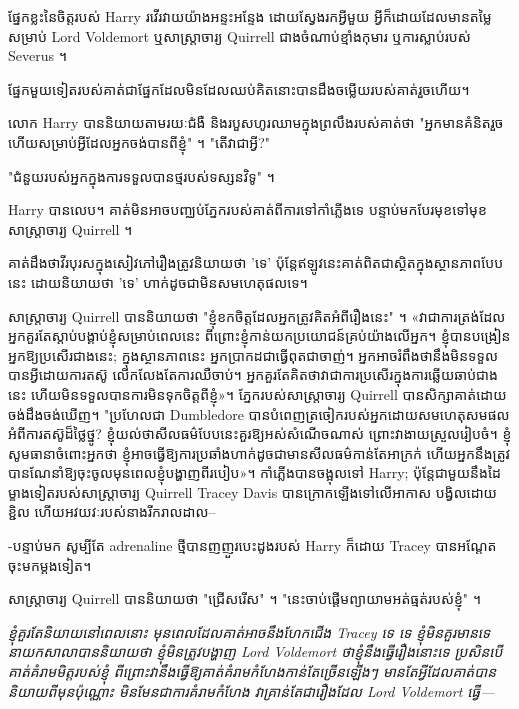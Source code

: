 ផ្នែកខ្លះនៃចិត្តរបស់ Harry រវើរវាយយ៉ាងអន្ទះអន្ទែង ដោយស្វែងរកអ្វីមួយ អ្វីក៏ដោយដែលមានតម្លៃសម្រាប់ Lord Voldemort ឬសាស្រ្តាចារ្យ Quirrell ជាងចំណាប់ខ្មាំងកុមារ ឬការស្លាប់របស់ Severus ។

ផ្នែក​មួយ​ទៀត​របស់​គាត់​ជា​ផ្នែក​ដែល​មិន​ដែល​ឈប់​គិត​នោះ​បាន​ដឹង​ចម្លើយ​របស់​គាត់​រួច​ហើយ។

លោក Harry បាននិយាយតាមរយៈជំងឺ និងរបួសហូរឈាមក្នុងព្រលឹងរបស់គាត់ថា "អ្នកមានគំនិតរួចហើយសម្រាប់អ្វីដែលអ្នកចង់បានពីខ្ញុំ" ។ "តើវាជាអ្វី?"

"ជំនួយរបស់អ្នកក្នុងការទទួលបានថ្មរបស់ទស្សនវិទូ" ។

Harry បានលេប។ គាត់មិនអាចបញ្ឈប់ភ្នែករបស់គាត់ពីការទៅកាំភ្លើងទេ បន្ទាប់មកបែរមុខទៅមុខសាស្រ្តាចារ្យ Quirrell ។

គាត់ដឹងថាវីរបុរសក្នុងសៀវភៅរឿងត្រូវនិយាយថា 'ទេ' ប៉ុន្តែឥឡូវនេះគាត់ពិតជាស្ថិតក្នុងស្ថានភាពបែបនេះ ដោយនិយាយថា 'ទេ' ហាក់ដូចជាមិនសមហេតុផលទេ។

សាស្រ្តាចារ្យ Quirrell បាននិយាយថា "ខ្ញុំខកចិត្តដែលអ្នកត្រូវគិតអំពីរឿងនេះ" ។ «វា​ជា​ការ​ត្រង់​ដែល​អ្នក​គួរ​តែ​ស្តាប់​បង្គាប់​ខ្ញុំ​សម្រាប់​ពេល​នេះ ពី​ព្រោះ​ខ្ញុំ​កាន់​យក​ប្រយោជន៍​គ្រប់​យ៉ាង​លើ​អ្នក។ ខ្ញុំបានបង្រៀនអ្នកឱ្យប្រសើរជាងនេះ; ក្នុងស្ថានភាពនេះ អ្នកប្រាកដជាធ្វើពុតជាចាញ់។ អ្នកអាចរំពឹងថានឹងមិនទទួលបានអ្វីដោយការតស៊ូ លើកលែងតែការឈឺចាប់។ អ្នក​គួរ​តែ​គិត​ថា​វា​ជា​ការ​ប្រសើរ​ក្នុង​ការ​ឆ្លើយ​ឆាប់​ជាង​នេះ ហើយ​មិន​ទទួល​បាន​ការ​មិន​ទុក​ចិត្ត​ពី​ខ្ញុំ»។ ភ្នែករបស់សាស្រ្តាចារ្យ Quirrell បានសិក្សាគាត់ដោយចង់ដឹងចង់ឃើញ។ "ប្រហែលជា Dumbledore បានបំពេញត្រចៀករបស់អ្នកដោយសមហេតុសមផលអំពីការតស៊ូដ៏ថ្លៃថ្នូ? ខ្ញុំយល់ថាសីលធម៌បែបនេះគួរឱ្យអស់សំណើចណាស់ ព្រោះវាងាយស្រួលរៀបចំ។ ខ្ញុំ​សូម​ធានា​ចំពោះ​អ្នក​ថា ខ្ញុំ​អាច​ធ្វើ​ឱ្យ​ការ​ប្រឆាំង​ហាក់​ដូច​ជា​មាន​សីលធម៌​កាន់​តែ​អាក្រក់ ហើយ​អ្នក​នឹង​ត្រូវ​បាន​ណែនាំ​ឱ្យ​ចុះ​ចូល​មុន​ពេល​ខ្ញុំ​បង្ហាញ​ពី​របៀប​»។ កាំភ្លើងបានចង្អុលទៅ Harry; ប៉ុន្តែជាមួយនឹងដៃម្ខាងទៀតរបស់សាស្រ្តាចារ្យ Quirrell Tracey Davis បានក្រោកឡើងទៅលើអាកាស បង្វិលដោយខ្ជិល ហើយអវយវៈរបស់នាងរីករាលដាល--

-បន្ទាប់មក សូម្បីតែ adrenaline ថ្មីបានញញួរបេះដូងរបស់ Harry ក៏ដោយ Tracey បានអណ្តែតចុះមកម្តងទៀត។

សាស្រ្តាចារ្យ Quirrell បាននិយាយថា "ជ្រើសរើស" ។ "នេះចាប់ផ្តើមព្យាយាមអត់ធ្មត់របស់ខ្ញុំ" ។

\emph{ខ្ញុំគួរតែនិយាយនៅពេលនោះ មុនពេលដែលគាត់អាចនឹងហែកជើង Tracey ទេ ទេ ខ្ញុំមិនគួរមានទេ នាយកសាលាបាននិយាយថា ខ្ញុំមិនត្រូវបង្ហាញ Lord Voldemort ថាខ្ញុំនឹងធ្វើរឿងនោះទេ ប្រសិនបើគាត់គំរាមមិត្តរបស់ខ្ញុំ ពីព្រោះវានឹងធ្វើឱ្យគាត់គំរាមកំហែងកាន់តែច្រើនឡើងៗ មានតែអ្វីដែលគាត់បាននិយាយពីមុនប៉ុណ្ណោះ មិនមែនជាការគំរាមកំហែង\emph{} វាគ្រាន់តែជារឿងដែល Lord Voldemort \emph{ធ្វើ}—}

